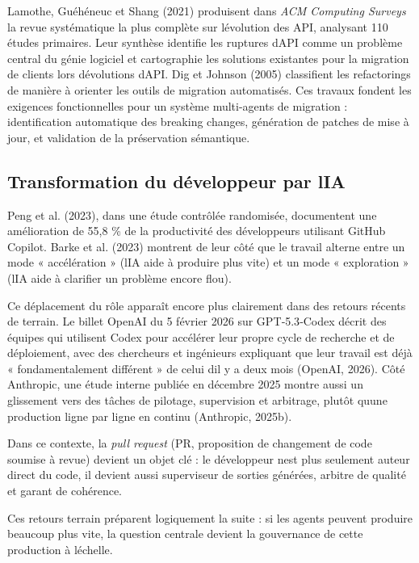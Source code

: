 \documentclass[12pt,a4paper]{article}
\begin{document}
Lamothe, Guéhéneuc et Shang (2021) produisent dans \emph{ACM Computing
Surveys} la revue systématique la plus complète sur
l\textquotesingle évolution des API, analysant 110 études primaires.
Leur synthèse identifie les ruptures d\textquotesingle API comme un
problème central du génie logiciel et cartographie les solutions
existantes pour la migration de clients lors
d\textquotesingle évolutions d\textquotesingle API. Dig et Johnson
(2005) classifient les refactorings de manière à orienter les outils de
migration automatisés. Ces travaux fondent les exigences fonctionnelles
pour un système multi-agents de migration : identification automatique
des breaking changes, génération de patches de mise à jour, et
validation de la préservation sémantique.

\subsection{Transformation du développeur par
l\textquotesingle IA}\label{transformation-du-duxe9veloppeur-par-lia}

Peng et al. (2023), dans une étude contrôlée randomisée, documentent une
amélioration de 55,8 \% de la productivité des développeurs utilisant
GitHub Copilot. Barke et al. (2023) montrent de leur côté que le travail
alterne entre un mode « accélération » (l\textquotesingle IA aide à
produire plus vite) et un mode « exploration » (l\textquotesingle IA
aide à clarifier un problème encore flou).

Ce déplacement du rôle apparaît encore plus clairement dans des retours
récents de terrain. Le billet OpenAI du 5 février 2026 sur GPT‑5.3‑Codex
décrit des équipes qui utilisent Codex pour accélérer leur propre cycle
de recherche et de déploiement, avec des chercheurs et ingénieurs
expliquant que leur travail est déjà « fondamentalement différent » de
celui d\textquotesingle il y a deux mois (OpenAI, 2026). Côté Anthropic,
une étude interne publiée en décembre 2025 montre aussi un glissement
vers des tâches de pilotage, supervision et arbitrage, plutôt
qu\textquotesingle une production ligne par ligne en continu (Anthropic,
2025b).

Dans ce contexte, la \emph{pull request} (PR, proposition de changement
de code soumise à revue) devient un objet clé : le développeur
n\textquotesingle est plus seulement auteur direct du code, il devient
aussi superviseur de sorties générées, arbitre de qualité et garant de
cohérence.

Ces retours terrain préparent logiquement la suite : si les agents
peuvent produire beaucoup plus vite, la question centrale devient la
gouvernance de cette production à l\textquotesingle échelle.
\end{document}
